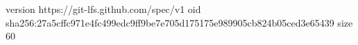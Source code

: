 version https://git-lfs.github.com/spec/v1
oid sha256:27a5cffc971e4fc499edc9ff9be7e705d175175e989905cb824b05ced3e65439
size 60
